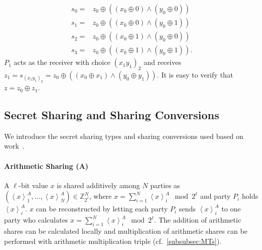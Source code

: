 \begin{equation}
    \begin{split}
        s_0=& z_{0} \oplus\left(\left(x_{0}\oplus 0 \right) \land \left(y_{0}\oplus 0\right) \right) \\
        s_{1}= & z_{0} \oplus\left(\left(x_{0}\oplus 0\right)  \land\left(y_{0} \oplus 1\right)\right) \\
        s_{2}= & z_{0} \oplus\left(\left(x_{0} \oplus 1\right) \land \left(y_{0}\oplus 0\right) \right) \\
        s_{3}=&z_{0} \oplus\left(\left(x_{0} \oplus 1\right) \land\left(y_{0} \oplus 1\right)\right) .
    \end{split}
\end{equation}
$P_1$ acts as the receiver with choice $\left(x_1y_1\right)_2 $ and receives $z_1=s_{\left(x_1y_1\right)_2 }=z_0\oplus \left(\left(x_0\oplus x_1\right)  \land \left(y_0\oplus  y_1\right)  \right)$. It is easy to verify that $z=z_0 \oplus z_1 $.


\subsection{Secret Sharing and Sharing Conversions}
\label{subsec:secretSharingAndSharingConversions}
We introduce the secret sharing types and sharing conversions used based on work~\cite{DSZ15}.


\paragraph{Arithmetic Sharing (A)}
\label{para:arithmeticSharing}
A $\ell$-bit value $x$ is shared additively among $N$ parties as $\left(\left\langle x\right\rangle ^A_1, \ldots,\left\langle x\right\rangle ^A_N \right) \in \mathbb{Z} ^N_{2^{\ell}}$, where $x=\sum_{i=1}^{N} \left\langle x\right\rangle^A_i \mod{2^{\ell}} $ and party $P_i$ holds $\left\langle x\right\rangle^A_i $. $x$ can be reconstructed by letting each party $P_i$ sends $\left\langle x\right\rangle^A_i $ to one party who calculates $x=\sum_{i=1}^{N} \left\langle x\right\rangle^A_i \mod{2^{\ell}}$. The addition of arithmetic shares can be calculated locally and multiplication of arithmetic shares can be performed with arithmetic multiplication triple (cf.~\autoref{subsubsec:MTs}).

